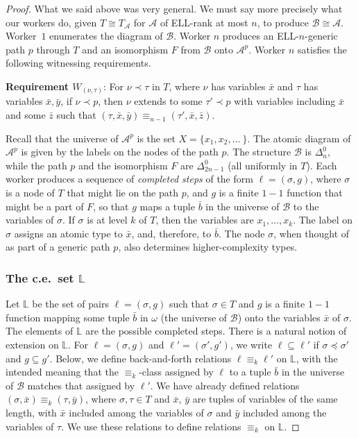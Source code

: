 \documentclass[10pt,a4paper]{article}
\newcommand{\ELL}{\textnormal{ELL}}
\theoremstyle{definition}
\begin{document}
\begin{proof}
		What we said above was very general. We must say more precisely what our workers do, given $T\cong T_\mathcal{A}$ for $\mathcal{A}$ of \ELL-rank at most $n$, to produce $\mathcal{B}\cong \mathcal{A}$. Worker~$1$ enumerates the diagram of $\mathcal{B}$. Worker $n$ produces an \ELL-$n$-generic path $p$ through $T$ and an isomorphism $F$ from $\mathcal{B}$ onto $\mathcal{A}^p$. Worker $n$ satisfies the following witnessing requirements.
		

\bigskip
\noindent
\textbf{Requirement $W_{(\nu,\tau)}$}:  For $\nu\prec\tau$ in $T$, where $\nu$ has variables $\bar{x}$ and $\tau$ has variables $\bar{x},\bar{y}$, if $\nu\prec p$, then $\nu$ extends to some $\tau'\prec p$ with variables including $\bar{x}$ and some $\bar{z}$ such that $(\tau,\bar{x},\bar{y})\equiv_{n-1}(\tau',\bar{x},\bar{z})$. 
		
\bigskip
Recall that the universe of $\mathcal{A}^p$ is the set $X = \{x_1,x_2,\ldots\ \}$. The atomic diagram of $\mathcal{A}^p$ is given by the labels on the nodes of the path $p$. The structure $\mathcal{B}$ is $\Delta^0_n$, while the path $p$ and the isomorphism $F$ are $\Delta^0_{2n-1}$ (all uniformly in $T$). Each worker produces a sequence of \emph{completed steps} of the form $\ell = (\sigma,g)$, where $\sigma$ is a node of $T$ that might lie on the path $p$, and $g$ is a finite $1-1$ function that might be a part of $F$, so that $g$ maps a tuple $\bar{b}$ in the universe of $\mathcal{B}$ to the variables of $\sigma$. If $\sigma$ is at level $k$ of $T$, then the variables are $x_1,\ldots,x_k$. The label on $\sigma$ assigns an atomic type to $\bar{x}$, and, therefore, to $\bar{b}$. The node $\sigma$, when thought of as part of a generic path $p$, also determines higher-complexity types. 
		
		\subsubsection{The c.e.\ set $\mathbb{L}$}
		
		Let $\mathbb{L}$ be the set of pairs $\ell = (\sigma,g)$ such that $\sigma\in T$ and $g$ is a finite $1-1$ function mapping some tuple $\bar{b}$ in $\omega$ (the universe of $\mathcal{B}$) onto the variables $\bar{x}$ of $\sigma$. The elements of $\mathbb{L}$ are the possible completed steps. There is a natural notion of extension on $\mathbb{L}$. For $\ell = (\sigma,g)$ and $\ell' = (\sigma',g')$, we write $\ell\subseteq\ell'$ if $\sigma\preceq\sigma'$ and $g\subseteq g'$. Below, we define back-and-forth relations $\ell\equiv_k\ell'$ on $\mathbb{L}$, with the intended meaning that the $\equiv_k$-class assigned by $\ell$ to a tuple $\bar{b}$ in the universe of $\mathcal{B}$ matches that assigned by $\ell'$. We have already defined relations $(\sigma,\bar{x})\equiv_k(\tau,\bar{y})$, where $\sigma,\tau\in T$ and $\bar{x}$, $\bar{y}$ are tuples of variables of the same length, with $\bar{x}$ included among the variables of $\sigma$ and $\bar{y}$ included among the variables of $\tau$. We use these relations to define relations $\equiv_k$ on $\mathbb{L}$. 
		

\end{proof}
\end{document}
